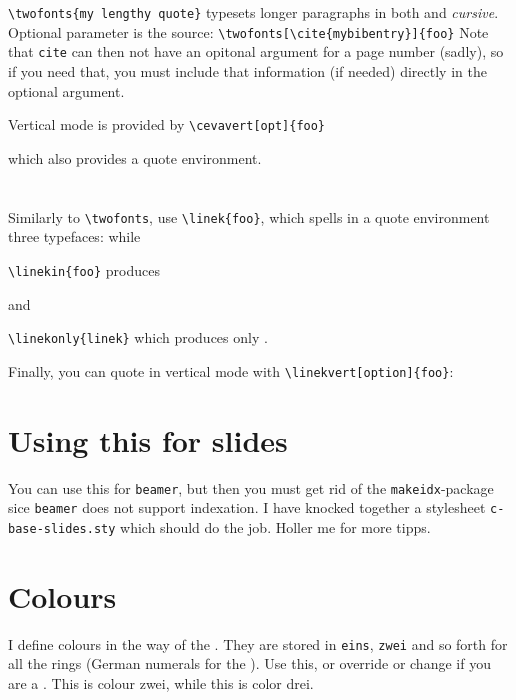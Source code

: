 \documentclass[14pt,ngerman]{extarticle}  %
\begin{document}
\verb|\twofonts{my lengthy quote}| typesets longer paragraphs in both  and \emph{cursive}. Optional parameter is the source: \verb|\twofonts[\cite{mybibentry}]{foo}| Note that \verb|cite| can then not have an opitonal argument for a page number (sadly), so if you need that, you must include that information (if needed) directly in the optional argument. 


Vertical mode is provided by \verb|\cevavert[opt]{foo}|


which also provides a quote environment.

\section{}

Similarly to \verb|\twofonts|, use \verb|\linek{foo}|, which spells in a quote environment three typefaces:
while

\verb|\linekin{foo}| produces 

and

\verb|\linekonly{linek}| which produces only 
.

Finally, you can quote  in vertical mode with \verb|\linekvert[option]{foo}|:


\section{Using this for slides}

You can use this for \verb|beamer|, but then you must get rid of the \verb|makeidx|-package sice \verb|beamer| does not support indexation. I have knocked together a stylesheet \verb|c-base-slides.sty| which should do the job. Holler me for more tipps.

\section{Colours}

I define colours in the way of the . They are stored in \verb|eins|, \verb|zwei| and so forth for all the rings (German numerals for the ). Use this, or override or change if you are a . {\color{zwei} This is colour zwei}, while {\color{drei} this is color drei}.
\end{document}
